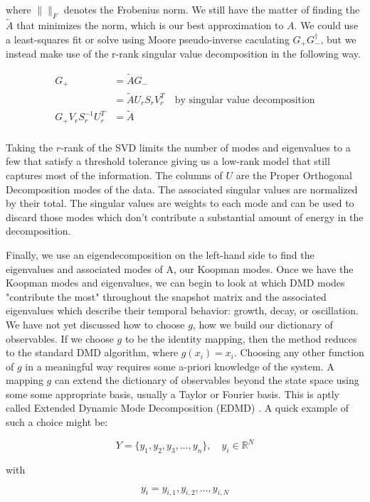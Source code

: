 \noindent where $\| \|_{F}$ denotes the Frobenius norm. We still have the matter of finding the 
${\tilde A}$ that minimizes the norm, which is our best approximation to $A$. We could
use a least-squares fit or solve using Moore pseudo-inverse caculating $G_+G^{\dagger}_-$, but we instead
 make use of the r-rank singular value decomposition in the following way.

\begin{align*}
    G_+ &= {\tilde A}G_- \\
    &= {\tilde A}U_rS_rV^{T}_r \quad \text{by singular value decomposition} \\ 
G_+ V_r S^{-1}_r U^{T}_r &= {\tilde A} \\
\end{align*}

Taking the $r$-rank of the SVD limits the number of modes and
 eigenvalues to a few that satisfy a threshold tolerance giving us a low-rank model
 that still captures most of the information. 
The columns of $U$ are the Proper Orthogonal Decomposition modes of the
 data. The associated singular values are normalized by their total.
The singular values are weights to each mode and can be used to discard those
 modes which don't contribute a substantial amount of energy in the decomposition.

Finally, we use an eigendecomposition on the left-hand side to find the 
eigenvalues and associated modes of A, our Koopman modes. Once we have the Koopman modes and eigenvalues, we can begin to look at which DMD modes
"contribute the most" throughout the snapshot matrix and the associated eigenvalues which describe
their temporal behavior: growth, decay, or oscillation. We have not yet
 discussed how to choose $g$, how we build our dictionary of observables. If we choose $g$ to 
be the identity mapping, then the method reduces to the standard DMD algorithm, where $g(x_i) = x_i$.
Choosing any other function of $g$ in a meaningful way requires some a-priori knowledge of the system.
A mapping $g$ can extend the dictionary of observables beyond the state space using some some appropriate 
basis, usually a Taylor or Fourier basis. This is aptly called Extended Dynamic Mode Decomposition (EDMD) \cite{doi:10.1137/1.9781611974508}. A quick example of such
a choice might be:

$$
Y = \{y_1, y_2, y_3, \dots, y_n  \}, \quad y_i \in \mathbb{R}^{N}
$$

\noindent with 

$$
y_i = {y_{i,1}, y_{i,2},\dots, y_{i,N}} 
$$

